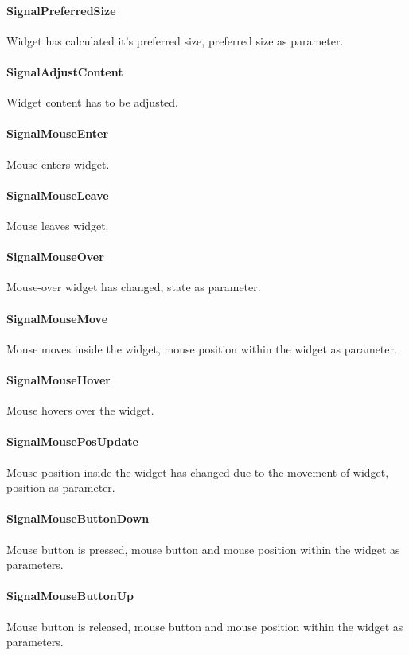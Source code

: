 \paragraph{SignalPreferredSize}
Widget has calculated it's preferred size, preferred size as parameter.

\paragraph{SignalAdjustContent}
Widget content has to be adjusted.

\paragraph{SignalMouseEnter}
Mouse enters widget.

\paragraph{SignalMouseLeave}
Mouse leaves widget.

\paragraph{SignalMouseOver}
Mouse-over widget has changed, state as parameter.

\paragraph{SignalMouseMove}
Mouse moves inside the widget, mouse position within the widget as parameter.

\paragraph{SignalMouseHover}
Mouse hovers over the widget.

\paragraph{SignalMousePosUpdate}
Mouse position inside the widget has changed due to the movement of widget, position as parameter.

\paragraph{SignalMouseButtonDown}
Mouse button is pressed, mouse button and mouse position within the widget as parameters.

\paragraph{SignalMouseButtonUp}
Mouse button is released, mouse button and mouse position within the widget as parameters.

